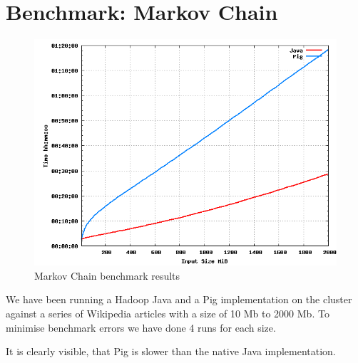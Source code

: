 \section{Benchmark: Markov Chain}

\begin{figure}[tb]
  \begin{center}
    \includegraphics[width=\textwidth]{../benchmarks/markov}
  \end{center}
  \caption{Markov Chain benchmark results}
  \label{fig:reducers}
\end{figure}

We have been running a Hadoop Java and a Pig implementation on the cluster against a series of Wikipedia articles with a size of 10 Mb to 2000 Mb. To minimise benchmark errors we have done 4 runs for each size.

It is clearly visible, that Pig is slower than the native Java implementation.